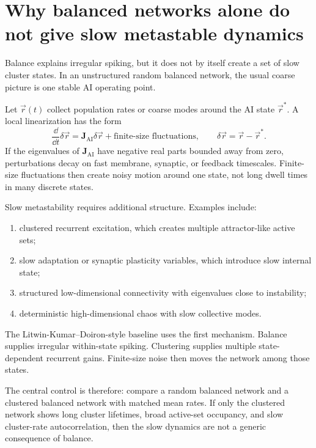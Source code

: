 \section{Why balanced networks alone do not give slow metastable dynamics}
\label{sec:why-balance-alone-not-metastable}

Balance explains irregular spiking, but it does not by itself create a set of slow cluster states. In an unstructured random balanced network, the usual coarse picture is one stable AI operating point.

Let $\vec r(t)$ collect population rates or coarse modes around the AI state $\vec r^*$. A local linearization has the form
%
\begin{equation}
  \frac{\dd}{\dd t}\delta\vec r
  =
  \mathbf{J}_{\mathrm{AI}}\delta\vec r
  +
  \text{finite-size fluctuations},
  \qquad
  \delta\vec r=\vec r-\vec r^* .
  \label{eq:ai-linearization}
\end{equation}
%
If the eigenvalues of $\mathbf{J}_{\mathrm{AI}}$ have negative real parts bounded away from zero, perturbations decay on fast membrane, synaptic, or feedback timescales. Finite-size fluctuations then create noisy motion around one state, not long dwell times in many discrete states.

Slow metastability requires additional structure. Examples include:
%
\begin{enumerate}[leftmargin=*]
  \item clustered recurrent excitation, which creates multiple attractor-like active sets;
  \item slow adaptation or synaptic plasticity variables, which introduce slow internal state;
  \item structured low-dimensional connectivity with eigenvalues close to instability;
  \item deterministic high-dimensional chaos with slow collective modes.
\end{enumerate}
%
The Litwin-Kumar--Doiron-style baseline uses the first mechanism. Balance supplies irregular within-state spiking. Clustering supplies multiple state-dependent recurrent gains. Finite-size noise then moves the network among those states.

The central control is therefore: compare a random balanced network and a clustered balanced network with matched mean rates. If only the clustered network shows long cluster lifetimes, broad active-set occupancy, and slow cluster-rate autocorrelation, then the slow dynamics are not a generic consequence of balance.


